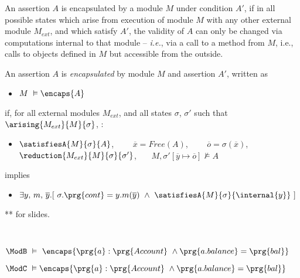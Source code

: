 {An assertion $A$  is  encapsulated by a module $M$ under condition $A'$,
if in all possible states which arise from execution of module $M$ with any other external module $M_{ext}$, and which satisfy $A'$, 
the validity of $A$} 
{ can only be changed via computations internal to that module} -- \emph{i.e.},  via a call to
a method from $M$, i.e.,
calls to objects defined in $M$ but accessible from the
outside.


\begin{definition}
\label{def:encapsulation}
An assertion $A$ is \emph{encapsulated} by module $M$ and assertion $A'$, written as
\begin{itemize}
 \item     $M\ \vDash \encaps{A}$
 \end{itemize}
if, for all external modules $M_{ext}$, and all states $\sigma$, $\sigma'$
such that $\arising{M_{ext}}{M}{\sigma}$, :

\begin{itemize}
 \item
  $\satisfiesA{M}{\sigma}{A}$,  \ \ \ \   $\overline{x}=Free(A)$, \  \  \ \ $\overline{o}=\sigma(\overline{x})$,\ \ \ \ $\reduction{M_{ext}}{M}{\sigma}{\sigma'}$, \ \ \ ${M},{\sigma'[\overline{y}\mapsto{\overline{o}}]}\not\vDash{A}$
 \end{itemize}

implies

 \begin{itemize}
 \item   $\exists y,\,m,\, \overline{y} .[\ \sigma.\prg{cont}= y.m(\overline{y})\ \wedge\  \satisfiesA{M}{\sigma}{\internal{y}} \ ]
$
 \end{itemize}
\end{definition}

** for slides.

\vspace{.2cm}
\noindent
\\
\strut \hspace{1cm}
$\ModB\ \vDash\ \encaps{ \prg{a}:\prg{Account}\ \wedge \prg{a.balance}=\prg{bal}}$
\\
\strut \hspace{1cm}
$\ModC\ \vDash \encaps{ \prg{a}:\prg{Account}\ \wedge \prg{a.balance}=\prg{bal}}$



